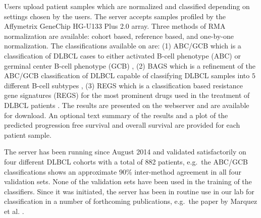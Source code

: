 Users upload patient samples which are normalized and classified depending on settings chosen by the users. 
The server accepts samples profiled by the Affymetrix GeneChip HG-U133 Plus 2.0 array. 
Three methods of RMA normalization are available: cohort based, reference based, and one-by-one normalization. 
The classifications available on \hemaClass{} are:
(1) ABC/GCB which is a classification of DLBCL cases to either activated B-cell phenotype (ABC) or germinal center B-cell phenotype (GCB) \cite{Alizadeh2000},
(2) BAGS which is a refinement of the ABC/GCB classification of DLBCL capable of classifying DLBCL samples into $5$ different B-cell subtypes \cite{DybkaerBoegsted2015},
(3) REGS which is a classification based resistance gene signatures (REGS) for the most prominent drugs used in the treatment of DLBCL patients \cite{Falgreen2015}.
The results are presented on the webserver and are available for download. 
An optional text summary of the results and a plot of the predicted progression free survival and overall survival are provided for each patient sample.

The server has been running since August 2014 and validated satisfactorily on four different DLBCL cohorts with a total of 882 patients, e.g.\ the ABC/GCB classifications shows an approximate $90 \%$ inter-method agreement in all four validation sets. 
None of the validation sets have been used in the training of the classifiers. 
Since it was initiated, the server has been in routine use in our lab for classification in a number of forthcoming publications, e.g.\ the paper by Marquez et al. \cite{Marquez2015}.

\begingroup
\renewcommand{\section}[2]{}%


\endgroup



